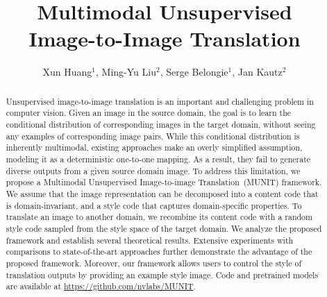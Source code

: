 \documentclass[runningheads]{llncs}
\begin{document}
\pagestyle{headings}
	\mainmatter
	\def\ECCV18SubNumber{143}  

	\title{Multimodal Unsupervised \\Image-to-Image Translation} 




	\author{Xun Huang$^{1}$, Ming-Yu Liu$^{2}$, Serge Belongie$^{1}$, Jan Kautz$^{2}$}


	
\maketitle              

	
	\begin{abstract}
		Unsupervised image-to-image translation is an important and challenging problem in computer vision.
		Given an image in the source domain, the goal is to learn the conditional distribution of corresponding images in the target domain, without seeing any examples of corresponding image pairs.
		While this conditional distribution is inherently multimodal, existing approaches make an overly simplified assumption, modeling it as a deterministic one-to-one mapping. As a result, they fail to generate diverse outputs from a given source domain image. To address this limitation, we propose a Multimodal Unsupervised Image-to-image \mbox{Translation~(MUNIT)} framework. We assume that the image representation can be decomposed into a content code that is domain-invariant, and a style code that captures domain-specific properties. To translate an image to another domain, we recombine its content code with a random style code sampled from the style space of the target domain. We analyze the proposed framework and establish several theoretical results. Extensive experiments with comparisons to state-of-the-art approaches further demonstrate the advantage of the proposed framework. Moreover, our framework allows users to control the style of translation outputs by providing an example style image.
		Code and pretrained models are available at \href{https://github.com/nvlabs/MUNIT}{https://github.com/nvlabs/MUNIT}.
		

	\end{abstract}
\end{document}

